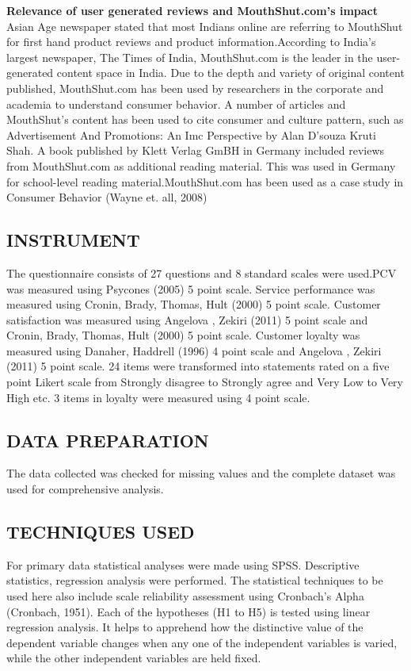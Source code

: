 \documentclass[a4paper, 12pt]{extarticle}
\begin{document}
{\textbf{Relevance of user generated reviews and MouthShut.com's impact}
Asian Age newspaper stated that most Indians online are referring to MouthShut for first hand product reviews and product information.According to India's largest newspaper, The Times of India, MouthShut.com is the leader in the user-generated content space in India. Due to the depth and variety of original content published, MouthShut.com has been used by researchers in the corporate and academia to understand consumer behavior. A number of articles and MouthShut's content has been used to cite consumer and culture pattern, such as Advertisement And Promotions: An Imc Perspective by Alan D'souza Kruti Shah. A book published by Klett Verlag GmBH in Germany included reviews from MouthShut.com as additional reading material. This was used in Germany for school-level reading material.MouthShut.com has been used as a case study in Consumer Behavior (Wayne et. all, 2008)

\subsection{INSTRUMENT}
The questionnaire consists of 27 questions and 8 standard scales were used.PCV was measured using Psycones (2005)  5 point scale. Service performance was measured using Cronin, Brady, Thomas, Hult (2000)  5 point scale. Customer satisfaction was measured using 
Angelova , Zekiri (2011)  5 point scale and Cronin, Brady, Thomas, Hult (2000)  5 point scale. Customer loyalty was measured using Danaher, Haddrell (1996) 4 point scale and Angelova , Zekiri (2011) 5 point scale. 24 items were transformed into statements rated on a five  point Likert scale from Strongly disagree to Strongly agree and Very Low to Very High etc. 3 items in loyalty were measured using 4 point scale.

\subsection{DATA PREPARATION}
The data collected was checked for missing values and the complete dataset was used for comprehensive analysis.

\subsection{TECHNIQUES USED}
For primary data statistical analyses were made using SPSS. Descriptive statistics, regression analysis were performed. The statistical techniques to be used here also include scale reliability assessment using Cronbach's Alpha (Cronbach, 1951). Each of the hypotheses (H1 to H5) is tested using linear regression analysis. It helps to apprehend how the distinctive value of the dependent variable changes when any one of the independent variables is varied, while the other independent variables are held fixed.

}
\end{document}
